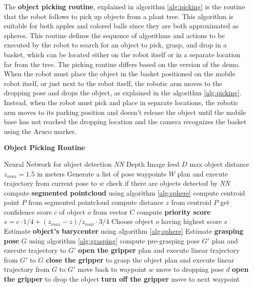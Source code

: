 The \textbf{object picking routine}, explained in algorithm \ref{alg:picking} is the routine that the robot follows
to pick up objects from a plant tree. This algorithm is suitable for both apples and colored balls since they are
both approximated as spheres. This routine defines the sequence of algorithms and actions to be executed by the robot
to search for an object to pick, grasp, and drop in a basket, which can be located either on the robot itself
or in a separate location far from the tree.
The picking routine differs based on the version of the demo. When the robot must place the object
in the basket positioned on the mobile robot itself, or just next to the robot itself, the robotic arm moves to
the dropping pose and drops the object, as explained in the algorithm \ref{alg:picking}. Instead, when the robot
must pick and place in separate locations, the robotic arm moves to its parking position and doesn't release the object
until the mobile base has not reached the dropping location and the camera recognizes the basket using the Aruco marker.

\begin{algorithm}[h]
    \caption{\textbf{Object Picking Routine}}
    \label{alg:picking}
    \begin{algorithmic}[1]
        \Require Neural Network for object detection \textit{NN}
        \Require Depth Image feed $D$
        \State max object distance $z_{max} = 1.5$ in meters
        \State Generate a list of pose waypoints $W$
            \State plan and execute trajectory from current pose to $w$
            \State check if there are objects detected by \textit{NN}
                \State compute \textbf{segmented pointcloud} using algorithm \ref{alg:sphere}
                \State compute centroid point $P$ from segmented pointcloud
                \State compute distance $z$ from centroid $P$
                \State get confidence score $c$ of object $o$ from vector $C$
                \State compute \textbf{priority score} $s = c \cdot 1/4 + (z_{max} - z)/z_{max} \cdot 3/4$
            \EndFor
            \State Choose object $o$ having highest score $s$
        \EndFor
        \State Estimate \textbf{object's barycenter} using algorithm \ref{alg:sphere}
        \State Estimate \textbf{grasping pose} $G$ using algorithm \ref{alg:grasping}
            \State compute pre-grasping pose $G'$
            \State plan and execute trajectory to $G'$
            \State \textbf{open the gripper}
            \State plan and execute linear trajectory from $G'$ to $G$
            \State \textbf{close the gripper} to grasp the object
            \State plan and execute linear trajectory from $G$ to $G'$
            \State move back to waypoint $w$
            \State move to dropping pose $d$
            \State \textbf{open the gripper} to drop the object
            \State \textbf{turn off the gripper}
        \Else
            \State move to next waypoint
        \EndIf
    \end{algorithmic}
\end{algorithm}

